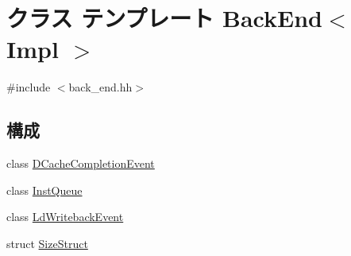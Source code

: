 \hypertarget{classBackEnd}{
\section{クラス テンプレート BackEnd$<$ Impl $>$}
\label{classBackEnd}
}


{\ttfamily \#include $<$back\_\-end.hh$>$}\subsection*{構成}
\begin{DoxyCompactItemize}
\item 
class \hyperlink{classBackEnd_1_1DCacheCompletionEvent}{DCacheCompletionEvent}
\item 
class \hyperlink{classBackEnd_1_1InstQueue}{InstQueue}
\item 
class \hyperlink{classBackEnd_1_1LdWritebackEvent}{LdWritebackEvent}
\item 
struct \hyperlink{structBackEnd_1_1SizeStruct}{SizeStruct}
\end{DoxyCompactItemize}
